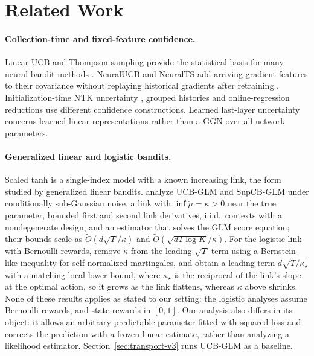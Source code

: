 \section{Related Work}\label{sec:related}

\paragraph{Collection-time and fixed-feature confidence.}
Linear UCB and Thompson sampling provide the statistical basis for many
neural-bandit methods \citep{abbasi2011improved,thompson1933likelihood,agrawal2013thompson}.
NeuralUCB and NeuralTS add arriving gradient features to their covariance
without replaying historical gradients after retraining
\citep{zhou2020neural,zhang2021neural}. Initialization-time NTK uncertainty
\citep{kassraie2022neural}, grouped histories \citep{salgia2023provably} and
online-regression reductions \citep{deb2024contextual} use different confidence
constructions. Learned last-layer uncertainty
\citep{riquelme2018deep,xu2022shallow,bui2025variance} concerns learned linear
representations rather than a GGN over all network parameters.

\paragraph{Generalized linear and logistic bandits.}
Scaled tanh is a single-index model with a known increasing link, the form
studied by generalized linear bandits. \citet{li2017provably} analyze
UCB-GLM and SupCB-GLM under conditionally sub-Gaussian noise, a link with
$\inf\dot\mu=\kappa>0$ near the true parameter, bounded first and second link
derivatives, i.i.d.\ contexts with a nondegenerate design, and an estimator
that solves the GLM score equation; their bounds scale as
$\tilde O(d\sqrt T/\kappa)$ and $\tilde O(\sqrt{dT\log K}/\kappa)$. For the
logistic link with Bernoulli rewards, \citet{faury2020improved} remove
$\kappa$ from the leading $\sqrt T$ term using a Bernstein-like inequality for
self-normalized martingales, and \citet{abeille2021instance} obtain a leading
term $d\sqrt{T/\kappa_\star}$ with a matching local lower bound, where
$\kappa_\star$ is the reciprocal of the link's slope at the optimal action, so
it grows as the link flattens, whereas $\kappa$ above shrinks. None of these
results applies as stated to our setting: the logistic analyses assume
Bernoulli rewards, and \citet{li2017provably} state rewards in $[0,1]$. Our
analysis also differs in its object: it allows an arbitrary predictable
parameter fitted with squared loss and corrects the prediction with a frozen
linear estimate, rather than analyzing a likelihood estimator.
Section~\ref{sec:transport-v3} runs UCB-GLM as a baseline.

